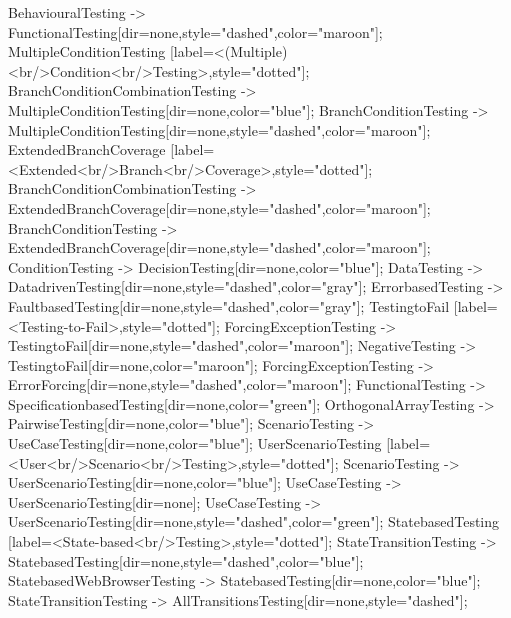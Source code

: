 \documentclass{article}
\begin{document}
{BehaviouralTesting -> FunctionalTesting[dir=none,style="dashed",color="maroon"];
MultipleConditionTesting [label=<(Multiple)<br/>Condition<br/>Testing>,style="dotted"];
BranchConditionCombinationTesting -> MultipleConditionTesting[dir=none,color="blue"];
BranchConditionTesting -> MultipleConditionTesting[dir=none,style="dashed",color="maroon"];
ExtendedBranchCoverage [label=<Extended<br/>Branch<br/>Coverage>,style="dotted"];
BranchConditionCombinationTesting -> ExtendedBranchCoverage[dir=none,style="dashed",color="maroon"];
BranchConditionTesting -> ExtendedBranchCoverage[dir=none,style="dashed",color="maroon"];
ConditionTesting -> DecisionTesting[dir=none,color="blue"];
DataTesting -> DatadrivenTesting[dir=none,style="dashed",color="gray"];
ErrorbasedTesting -> FaultbasedTesting[dir=none,style="dashed",color="gray"];
TestingtoFail [label=<Testing-to-Fail>,style="dotted"];
ForcingExceptionTesting -> TestingtoFail[dir=none,style="dashed",color="maroon"];
NegativeTesting -> TestingtoFail[dir=none,color="maroon"];
ForcingExceptionTesting -> ErrorForcing[dir=none,style="dashed",color="maroon"];
FunctionalTesting -> SpecificationbasedTesting[dir=none,color="green"];
OrthogonalArrayTesting -> PairwiseTesting[dir=none,color="blue"];
ScenarioTesting -> UseCaseTesting[dir=none,color="blue"];
UserScenarioTesting [label=<User<br/>Scenario<br/>Testing>,style="dotted"];
ScenarioTesting -> UserScenarioTesting[dir=none,color="blue"];
UseCaseTesting -> UserScenarioTesting[dir=none];
UseCaseTesting -> UserScenarioTesting[dir=none,style="dashed",color="green"];
StatebasedTesting [label=<State-based<br/>Testing>,style="dotted"];
StateTransitionTesting -> StatebasedTesting[dir=none,style="dashed",color="blue"];
StatebasedWebBrowserTesting -> StatebasedTesting[dir=none,color="blue"];
StateTransitionTesting -> AllTransitionsTesting[dir=none,style="dashed"];

}
\end{document}
